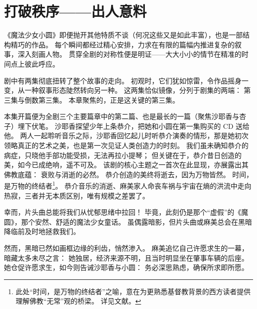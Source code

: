 \chapter[打破秩序——出人意料]{打破秩序——出人意料}



《魔法少女小圆》即便抛开其他特质不谈（何况这些又是如此丰富），也是一部结构精巧的作品。
每个瞬间都经过精心安排，力求在有限的篇幅内推进复杂的叙事，深入刻画人物。
贯穿全剧的对称性便是明证——大大小小的情节在精准的时间点上彼此呼应。

剧中有两集彻底扭转了整个故事的走向。
初观时，它们犹如惊雷，令作品摇身一变，从一种叙事形态陡然转向另一种。
这两集恰似镜像，分列于剧集的两端：
第三集与倒数第三集。
本章聚焦的，正是这关键的第三集。

本集开篇便为全剧三个主要篇章中的第二篇、也是最长的一篇（聚焦沙耶香与杏子）埋下伏笔。
沙耶香探望少年上条恭介，把她和小圆在第一集购买的 CD 送给他。
两人一起聆听音乐之际，沙耶香回忆起儿时听恭介演奏的情形，那是她初次领略真正的艺术之美，也是第一次见证人类创造力的时刻。
我们虽未确知恭介的病症，只晓他手部功能受损，无法再拉小提琴；
但关键在于，恭介昔日创造的美，如今已成绝响，遥不可及。
该剧的核心主题之一首次在此显现，亦展露出其佛教底蕴：
衰败与消逝的必然。
恭介创造的美终将逝去，因为万物皆然。
时间，是万物的终结者\footnote{%
    此处“时间，是万物的终结者”之喻，意在为更熟悉基督教背景的西方读者提供理解佛教“无常”观的桥梁。
    详见文献\cite{smart1993buddhism-christianity}。
}。
恭介音乐的消逝、麻美家人命丧车祸与宇宙在熵的洪流中走向热寂，三者并无本质区别，唯有规模之差罢了。

幸而，片头曲总能将我们从忧郁思绪中拉回！
毕竟，此刻仍是那个“虚假”的《魔圆》，那个安然、舒适的魔法少女童话。
虽偶露暗影，但片头曲或麻美总会在黑暗降临前及时地拯救我们。

然而，黑暗已然如画框边缘的利齿，悄然渗入。
麻美追忆自己许愿求生的一幕，暗藏太多未尽之言：
她独居，经济来源不明，且当时明显坐在肇事车辆的后座。
她仓促许愿求生，如今则告诫沙耶香与小圆：
务必深思熟虑，确保所求即所愿。


